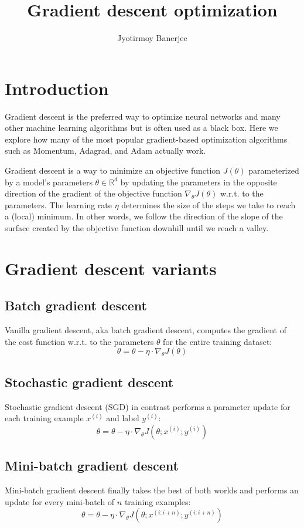 \documentclass{article}
\title{Gradient descent optimization}
\author{Jyotirmoy Banerjee}
\begin{document}
\maketitle

\section{Introduction}
Gradient descent is the preferred way to optimize neural networks and many other machine learning algorithms but is often used as a black box. Here we explore how many of the most popular gradient-based optimization algorithms such as Momentum, Adagrad, and Adam actually work.


Gradient descent is a way to minimize an objective function $J(\theta)$ parameterized by a model's parameters $\theta \in \mathbb{R}^d$ by updating the parameters in the opposite direction of the gradient of the objective function $\nabla_\theta J(\theta)$ w.r.t. to the parameters. The learning rate $\eta$ determines the size of the steps we take to reach a (local) minimum. In other words, we follow the direction of the slope of the surface created by the objective function downhill until we reach a valley.

\section{Gradient descent variants}

\subsection{Batch gradient descent}
Vanilla gradient descent, aka batch gradient descent, computes the gradient of the cost function w.r.t. to the parameters $\theta$ for the entire training dataset:
\[\theta = \theta - \eta \cdot \nabla_\theta J( \theta)\]

\subsection{Stochastic gradient descent}
Stochastic gradient descent (SGD) in contrast performs a parameter update for each training example $x^{(i)}$ and label $y^{(i)}$:
\[\theta = \theta - \eta \cdot \nabla_\theta J( \theta; x^{(i)}; y^{(i)})\]

\subsection{Mini-batch gradient descent}
Mini-batch gradient descent finally takes the best of both worlds and performs an update for every mini-batch of $n$ training examples:
\[\theta = \theta - \eta \cdot \nabla_\theta J( \theta; x^{(i:i+n)}; y^{(i:i+n)})\]
\end{document}
